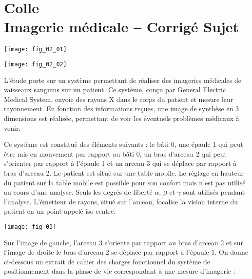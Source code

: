 \chapter*{Colle  \\
Imagerie médicale -- \ifprof Corrigé \else Sujet \fi}


\iflivret {} \else
\ifprof  {} \else \fi
\fi
\setcounter{question}{0}





\begin{marginfigure}
\texttt{[image: fig\_02\_01]}
\end{marginfigure}

\begin{marginfigure}
\texttt{[image: fig\_02\_02]}
\end{marginfigure}

L'étude porte sur un système permettant de réaliser des imageries médicales de vaisseaux sanguins sur un patient. Ce système, conçu par General Electric Medical System, envoie des rayons X dans le corps du patient et mesure leur rayonnement. En fonction des informations reçues, une image de synthèse en 3 dimensions est réalisée, permettant de voir les éventuels problèmes médicaux à venir. 

 Ce système est constitué des éléments suivants : le bâti 0, une épaule 1 qui peut être mis en mouvement par rapport au bâti 0, un bras d’arceau 2 qui peut s’orienter par rapport à l’épaule 1 et un arceau 3 qui se déplace par rapport à bras d’arceau 2. Le patient est situé sur une table mobile. Le réglage en hauteur du patient sur la table mobile est possible pour son confort mais n'est pas utilisé au cours d'une analyse. Seuls les degrés de liberté $\alpha$, $\beta$ et $\gamma$ sont utilisés pendant l’analyse. L'émetteur de rayons, situé sur l'arceau, focalise la vision interne du patient en un point appelé iso centre. 

\begin{marginfigure}
\texttt{[image: fig\_03]}
\end{marginfigure}

Sur l’image de gauche, l’arceau 3 s’oriente par rapport au bras d’arceau 2 et sur l’image de droite le bras d’arceau 2 se déplace par rapport à l’épaule 1. On donne ci-dessous un extrait de cahier des charges fonctionnel du système de positionnement dans la phase de vie correspondant à une mesure d'imagerie : 

